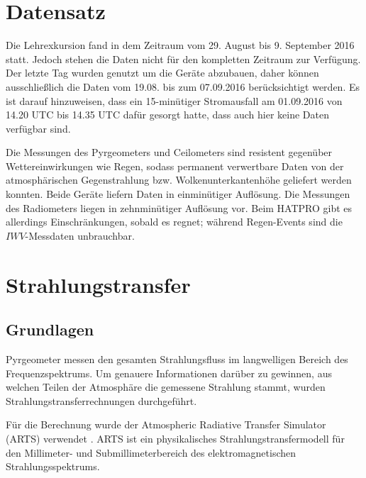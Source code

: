 \documentclass[10pt,a4paper,compsoc,peer review papers]{IEEEtran}
\begin{document}
\section{Datensatz}\label{sec:datensatz}
Die Lehrexkursion fand in dem Zeitraum vom 29. August bis 9. September 2016
statt. Jedoch stehen die Daten nicht für den kompletten Zeitraum zur Verfügung.
Der letzte Tag wurden genutzt um die Geräte abzubauen, daher können
ausschließlich die Daten vom 19.08. bis zum 07.09.2016 berücksichtigt werden.
Es ist darauf hinzuweisen, dass ein 15-minütiger Stromausfall am 01.09.2016
von 14.20 UTC bis 14.35 UTC dafür gesorgt hatte, dass auch hier keine Daten
verfügbar sind.

Die Messungen des Pyrgeometers und Ceilometers sind resistent gegenüber
Wettereinwirkungen wie Regen, sodass permanent verwertbare Daten von der
atmosphärischen Gegenstrahlung bzw. Wolkenunterkantenhöhe geliefert werden
konnten. Beide Geräte liefern Daten in einminütiger Auflösung. Die Messungen
des Radiometers liegen in zehnminütiger Auflösung vor. Beim HATPRO gibt es
allerdings Einschränkungen, sobald es regnet; während Regen-Events sind die
$IWV$-Messdaten unbrauchbar.

\section{Strahlungstransfer}\label{sec:strahlungstransfer}
\subsection{Grundlagen}\label{subsec:grundlagen}
Pyrgeometer messen den gesamten Strahlungsfluss im langwelligen Bereich des
Frequenzspektrums. Um genauere Informationen darüber zu gewinnen, aus welchen
Teilen der Atmosphäre die gemessene Strahlung stammt, wurden
Strahlungstransferrechnungen durchgeführt.

Für die Berechnung wurde der Atmospheric Radiative Transfer Simulator (ARTS)
verwendet \cite{Eriksson2011}. ARTS ist ein physikalisches
Strahlungstransfermodell für den Millimeter- und Submillimeterbereich des
elektromagnetischen Strahlungsspektrums.
\end{document}
